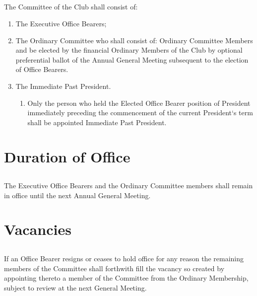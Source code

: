 \documentclass[10.5pt]{article}
\begin{document}
\subsection{} The Committee of the Club shall consist of:
\begin{enumerate}[label=(\alph*)]
    \item The Executive Office Bearers;
    \item The Ordinary Committee who shall consist of: Ordinary Committee Members and be elected by the financial Ordinary Members of the Club by optional preferential ballot of the Annual General Meeting subsequent to the election of Office Bearers.
    \item The Immediate Past President.
    \begin{enumerate}[label=(\roman*)]
        \item Only the person who held the Elected Office Bearer position of President immediately preceding the commencement of the current President‘s term shall be appointed Immediate Past President. 
        \newline
    \end{enumerate}
\end{enumerate}


\section{Duration of Office}
\subsection{} The Executive Office Bearers and the Ordinary Committee members shall remain in office until the next Annual General Meeting.
\newline


\section{Vacancies}
\subsection{} If an Office Bearer resigns or ceases to hold office for any reason the remaining members of the Committee shall forthwith fill the vacancy so created by appointing thereto a member of the Committee from the Ordinary Membership, subject to review at the next General Meeting.
\newline
\end{document}
